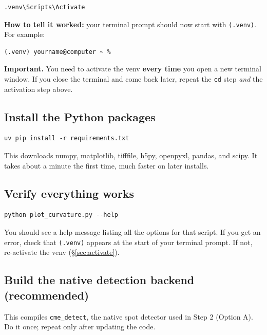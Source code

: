 \documentclass[11pt]{article}
\newcommand{\code}[1]{\texttt{#1}}
\begin{document}
\begin{lstlisting}
.venv\Scripts\Activate
\end{lstlisting}

\textbf{How to tell it worked:} your terminal prompt should now start
with \code{(.venv)}. For example:

\begin{lstlisting}
(.venv) yourname@computer ~ %
\end{lstlisting}

\begin{warnbox}
\textbf{Important.} You need to activate the venv \textbf{every time}
you open a new terminal window. If you close the terminal and come
back later, repeat the \code{cd} step \emph{and} the activation step
above.
\end{warnbox}

\subsection{Install the Python packages}

\begin{lstlisting}
uv pip install -r requirements.txt
\end{lstlisting}

This downloads numpy, matplotlib, tifffile, h5py, openpyxl, pandas,
and scipy. It takes about a minute the first time, much faster on
later installs.

\subsection{Verify everything works}

\begin{lstlisting}
python plot_curvature.py --help
\end{lstlisting}

You should see a help message listing all the options for that script.
If you get an error, check that \code{(.venv)} appears at the start
of your terminal prompt. If not, re-activate the venv (\S\ref{sec:activate}).

\subsection{Build the native detection backend (recommended)}\label{sec:build-native}

This compiles \code{cme\_detect}, the native spot detector used in
Step 2 (Option A). Do it once; repeat only after updating the code.
\end{document}
